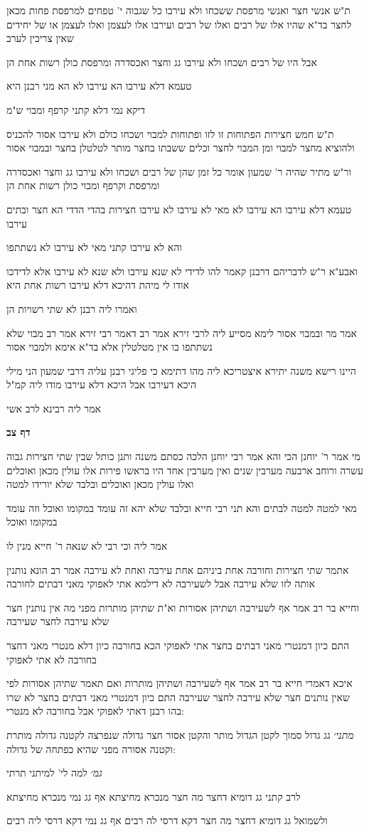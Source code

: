 \documentclass[12pt, openany]{book}
\newcommand{\sethebfont}{
\fontsize{10.5pt}{21.0pt} \selectfont
}
\newcommand{\textblock}[1]{
{\sethebfont #1\\}	
}
\newcommand{\sectname}{}
\newcommand{\newsection}[1]{
	\addcontentsline{toc}{section}{#1}
	\renewcommand{\sectname}{#1}	
	\vspace{-\baselineskip}
	\begin{center}
		\textbf{%
\fontsize{16pt}{16pt}\selectfont
			#1}
	\end{center}
	\vspace{-\baselineskip}
	\nopagebreak
}
\begin{document}
\textblock{ת"ש אנשי חצר ואנשי מרפסת ששכחו ולא עירבו כל שגבוה י' טפחים למרפסת פחות מכאן לחצר בד"א שהיו אלו של רבים ואלו של רבים ועירבו אלו לעצמן ואלו לעצמן או של יחידים שאין צריכין לערב}
\textblock{אבל היו של רבים ושכחו ולא עירבו גג וחצר ואכסדרה ומרפסת כולן רשות אחת הן}
\textblock{טעמא דלא עירבו הא עירבו לא הא מני רבנן היא}
\textblock{דיקא נמי דלא קתני קרפף ומבוי ש"מ}
\textblock{ת"ש חמש חצירות הפתוחות זו לזו ופתוחות למבוי ושכחו כולם ולא עירבו אסור להכניס ולהוציא מחצר למבוי ומן המבוי לחצר וכלים ששבתו בחצר מותר לטלטלן בחצר ובמבוי אסור}
\textblock{ור"ש מתיר שהיה ר' שמעון אומר כל זמן שהן של רבים ושכחו ולא עירבו גג וחצר ואכסדרה ומרפסת וקרפף ומבוי כולן רשות אחת הן}
\textblock{טעמא דלא עירבו הא עירבו לא מאי לא עירבו לא עירבו חצירות בהדי הדדי הא חצר ובתים עירבו}
\textblock{והא לא עירבו קתני מאי לא עירבו לא נשתתפו}
\textblock{ואבע"א ר"ש לדבריהם דרבנן קאמר להו לדידי לא שנא עירבו ולא שנא לא עירבו אלא לדידכו אודו לי מיהת דהיכא דלא עירבו רשות אחת היא}
\textblock{ואמרו ליה רבנן לא שתי רשויות הן}
\textblock{אמר מר ובמבוי אסור לימא מסייע ליה לרבי זירא אמר רב דאמר רבי זירא אמר רב מבוי שלא נשתתפו בו אין מטלטלין אלא בד"א אימא ולמבוי אסור}
\textblock{היינו רישא משנה יתירא איצטריכא ליה מהו דתימא כי פליגי רבנן עליה דרבי שמעון הני מילי היכא דעירבו אבל היכא דלא עירבו מודו ליה קמ"ל}
\textblock{אמר ליה רבינא לרב אשי}
\newsection{דף צב}
\textblock{מי אמר ר' יוחנן הכי והא אמר רבי יוחנן הלכה כסתם משנה ותנן כותל שבין שתי חצירות גבוה עשרה ורוחב ארבעה מערבין שנים ואין מערבין אחד היו בראשו פירות אלו עולין מכאן ואוכלים ואלו עולין מכאן ואוכלים ובלבד שלא יורידו למטה}
\textblock{מאי למטה למטה לבתים והא תני רבי חייא ובלבד שלא יהא זה עומד במקומו ואוכל וזה עומד במקומו ואוכל}
\textblock{אמר ליה וכי רבי לא שנאה ר' חייא מנין לו}
\textblock{אתמר שתי חצירות וחורבה אחת ביניהם אחת עירבה ואחת לא עירבה אמר רב הונא נותנין אותה לזו שלא עירבה אבל לשעירבה לא דילמא אתי לאפוקי מאני דבתים לחורבה}
\textblock{וחייא בר רב אמר אף לשעירבה ושתיהן אסורות וא"ת שתיהן מותרות מפני מה אין נותנין חצר שלא עירבה לחצר שעירבה}
\textblock{התם כיון דמנטרי מאני דבתים בחצר אתי לאפוקי הכא בחורבה כיון דלא מנטרי מאני דחצר בחורבה לא אתי לאפוקי}
\textblock{איכא דאמרי חייא בר רב אמר אף לשעירבה ושתיהן מותרות ואם תאמר שתיהן אסורות לפי שאין נותנים חצר שלא עירבה לחצר שעירבה התם כיון דמנטרי מאני דבתים בחצר לא שרו בהו רבנן דאתי לאפוקי אבל בחורבה לא מנטרי:}
\textblock{{\large\emph{מתני׳}} גג גדול סמוך לקטן הגדול מותר והקטן אסור חצר גדולה שנפרצה לקטנה גדולה מותרת וקטנה אסורה מפני שהיא כפתחה של גדולה:}
\textblock{{\large\emph{גמ׳}} למה לי' למיתני תרתי}
\textblock{לרב קתני גג דומיא דחצר מה חצר מנכרא מחיצתא אף גג נמי מנכרא מחיצתא}
\textblock{ולשמואל גג דומיא דחצר מה חצר דקא דרסי לה רבים אף גג נמי דקא דרסי ליה רבים}
\end{document}
